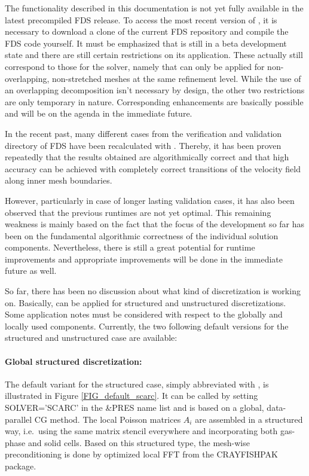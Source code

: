 The \scarc{} functionality described in this documentation is not yet fully available in the latest precompiled FDS release.
To access the most recent version of \scarc{}, it is necessary to download a clone of the current FDS repository and compile the FDS code yourself. 
It must be emphasized that \scarc{} is still in a beta development state and there are still certain restrictions on its application. These actually still correspond to those for the \uglmat{} solver, namely that \scarc{} can only be applied for non-overlapping, non-stretched meshes at the same refinement level. While the use of an overlapping decomposition isn't necessary by design, the other two restrictions are only temporary in nature. Corresponding enhancements are basically possible and will be on the agenda in the immediate future.

In the recent past, many different cases from the verification and validation directory of FDS have been recalculated with \scarc{}.
Thereby, it has been proven repeatedly that the results obtained are algorithmically correct and that high accuracy can be achieved with completely correct transitions of the velocity field along inner mesh boundaries.

However, particularly in case of longer lasting validation cases, it has also been observed that the previous runtimes are not yet optimal. This remaining weakness is mainly based on the fact that the focus of the development so far has been on the fundamental algorithmic correctness of the individual solution components. Nevertheless, there is still a great potential for runtime improvements and appropriate improvements will be done in the immediate future as well.

So far, there has been no discussion about what kind of discretization \scarc{} is working on. 
Basically, \scarc{} can be applied for structured and unstructured discretizations. Some application notes must be considered with respect to the globally and locally used components. Currently, the two following default versions for the structured and unstructured case are available:

\paragraph{Global structured discretization:}
The default variant for the structured case, simply abbreviated with \scarc{}, is illustrated in Figure \ref{FIG_default_scarc}. It can be called by setting {\ct SOLVER='SCARC'} in the {\ct \&PRES} name list and is based on a global, data-parallel CG method. The local Poisson matrices $A_i$ are assembled in a structured way, i.e.\ using the same matrix stencil everywhere and incorporating both gas-phase and solid cells.
Based on this structured type, the mesh-wise preconditioning is done by optimized local FFT from the CRAYFISHPAK package. 

